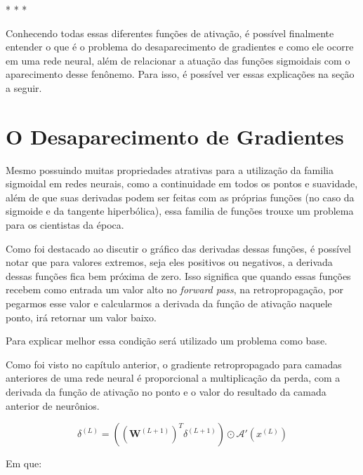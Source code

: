 \medskip
\begin{center}
 * * *
\end{center}
\medskip

Conhecendo todas essas diferentes funções de ativação, é possível finalmente entender o que é o problema do desaparecimento de gradientes e como ele ocorre em uma rede neural, além de relacionar a atuação das funções sigmoidais com o aparecimento desse fenônemo. Para isso, é possível ver essas explicações na seção a seguir.

\section{O Desaparecimento de Gradientes}

Mesmo possuindo muitas propriedades atrativas para a utilização da familia sigmoidal em redes neurais, como a continuidade em todos os pontos e suavidade, além de que suas derivadas podem ser feitas com as próprias funções (no caso da sigmoide e da tangente hiperbólica), essa familia de funções trouxe um problema para os cientistas da época.

Como foi destacado ao discutir o gráfico das derivadas dessas funções, é possível notar que para valores extremos, seja eles positivos ou negativos, a derivada dessas funções fica bem próxima de zero. Isso significa que quando essas funções recebem como entrada um valor alto no \textit{forward pass}, na retropropagação, por pegarmos esse valor e calcularmos a derivada da função de ativação naquele ponto, irá retornar um valor baixo.

Para explicar melhor essa condição será utilizado um problema como base.

Como foi visto no capítulo anterior, o gradiente retropropagado para camadas anteriores de uma rede neural é proporcional a multiplicação da perda, com a derivada da função de ativação no ponto e o valor do resultado da camada anterior de neurônios. 

\[
    \delta^{(L)} = \left( \left( \textbf{W}^{(L+1)} \right)^T \delta^{(L+1)} \right)  \odot \mathcal{A}'(x^{(L)})
\]

Em que: 

